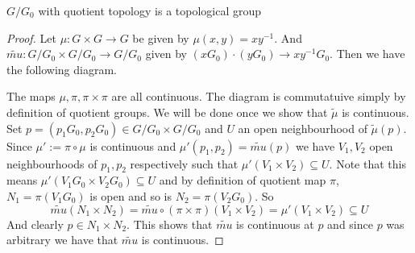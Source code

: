 \documentclass{article}
\begin{document}
\begin{exercise*}
    $G/G_0$ with quotient topology is a topological group
\end{exercise*}
\begin{proof}
    Let $\mu:G\times G\to G$ be given by $\mu(x,y) = xy^{-1}$. And $\tilde{mu}:G/G_0\times G/G_0\to G/G_0$ given by $(xG_0)\cdot (yG_0)\to xy^{-1}G_0$. Then we have the following diagram.
    \begin{center}
    \end{center}
    The maps $\mu,\pi,\pi\times \pi$ are all continuous. The diagram is commutatuive simply by definition of quotient groups.
    We will be done once we show that $\tilde{\mu}$ is continuous. Set $p=(p_1G_0,p_2G_0)\in G/G_0\times G/G_0$ and $U$ an open neighbourhood of $\tilde{\mu}(p)$. Since $\mu':=\pi\circ\mu$ is continuous and $\mu'(p_1,p_2)=\tilde{mu}(p)$ we have $V_1,V_2$ open neighbourhoods of $p_1,p_2$ respectively such that $\mu'(V_1\times V_2)\subseteq U$.
    Note that this means $\mu'(V_1G_0\times V_2G_0)\subseteq U$ and by definition of quotient map $\pi$, $N_1=\pi(V_1G_0)$ is open and so is $N_2=\pi(V_2G_0)$.
    So $$\tilde{mu}(N_1\times N_2) = \tilde{mu}\circ(\pi\times\pi)(V_1\times V_2) = \mu'(V_1\times V_2)\subseteq U$$
    And clearly $p\in N_1\times N_2$. This shows that $\tilde{mu}$ is continuous at $p$ and since $p$ was arbitrary we have that $\tilde{mu}$ is continuous.
\end{proof}
\end{document}
